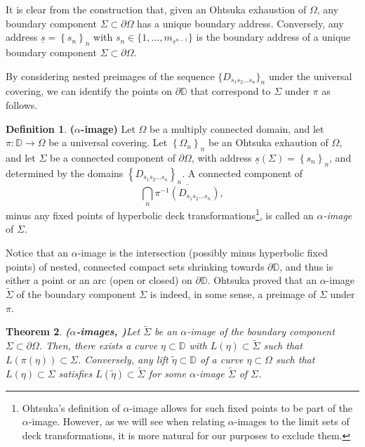 \documentclass[11pt,a4paper,reqno]{amsart}
\theoremstyle{plain}
\newtheorem{thm}{Theorem}[section]
\theoremstyle{definition}
\newtheorem{defi}[thm]{Definition}
\theoremstyle{plain}
\def\DD{\mathbb{D}}
\renewcommand{\tilde}{\widetilde}
\begin{document}
It is clear from the construction that, given an Ohtsuka exhaustion of $\Omega$, any boundary component $ \Sigma\subset\partial\Omega $ has a unique boundary address. Conversely, any  address $\underline{s}=\left\lbrace s_n\right\rbrace _n$ with $s_n\in\{1, \dots, m_{\underline{s}^{n-1}}\}$ is the boundary address of a unique boundary component $\Sigma\subset\partial\Omega$.

By considering nested preimages of the sequence $\{D_{s_1s_2\dots s_n}\}_n$ under the universal covering, we can identify the points on $ \partial\mathbb{D} $ that correspond to  $\Sigma$ under $ \pi $ as follows.

\begin{defi}{\bf ($ \alpha $-image)}
Let $ \Omega $ be a multiply connected domain, and let $ \pi\colon\mathbb{D}\to\Omega $ be a universal covering. Let $ \left\lbrace \Omega_n\right\rbrace _n $ be an Ohtsuka exhaution of $ \Omega $, and let $ \Sigma $ be a connected component of $ \partial \Omega $, with address $ \underline s(\Sigma) = \left\lbrace s_n\right\rbrace _n$, and determined by the domains $ \left\lbrace D_{s_1s_2\dots s_n}\right\rbrace _n  $. A connected component of $$\bigcap_{n} \overline{\pi^{-1}(D_{s_1s_2\dots s_n})},$$ minus any fixed points of hyperbolic deck transformations\footnote{Ohtsuka's definition of $\alpha$-image allows for such fixed points to be part of the $\alpha$-image. However, as we will see when relating $\alpha$-images to the limit sets of deck transformations, it is more natural for our purposes to exclude them.}, is called an {\em $\alpha$-image} of $\Sigma$.
\end{defi}

Notice that an $\alpha$-image is the intersection (possibly minus hyperbolic fixed points) of nested, connected compact sets shrinking towards $\partial\DD$, and thus is either a point or an arc (open or closed) on $\partial\DD$. Ohtsuka proved that an $\alpha$-image $\tilde\Sigma$ of the boundary component $\Sigma$ is indeed, in some sense, a preimage of $\Sigma$ under $\pi$.
\begin{thm}{\bf($ \alpha $-images, {\normalfont \cite[Sect. I.5]{Oht54}})}\label{thm:alphaimage}
Let $\tilde\Sigma$ be an $\alpha$-image of the boundary component $\Sigma\subset\partial\Omega$. Then, there exists a curve $\eta\subset\DD$ with $L(\eta)\subset\tilde\Sigma$ such that $L(\pi(\eta))\subset\Sigma$. Conversely, any lift $\tilde\eta\subset\DD$ of a curve $\eta\subset\Omega$ such that $L(\eta)\subset\Sigma$ satisfies $L(\tilde\eta)\subset \tilde\Sigma$ for some $\alpha$-image $\tilde\Sigma$ of $\Sigma$.
\end{thm}
\end{document}

